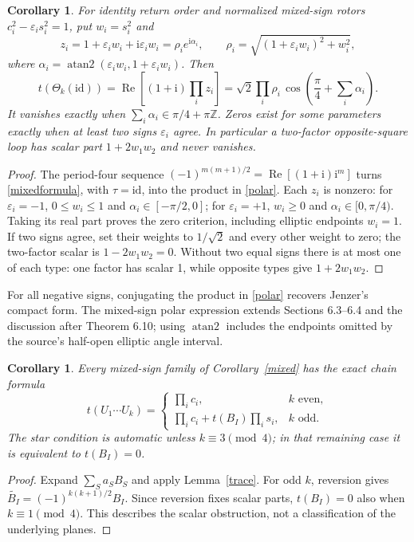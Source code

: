 \documentclass[11pt]{article}
\newtheorem{corollary}[theorem]{Corollary}
\begin{document}
\begin{corollary}\label{mixedpolar}
For identity return order and normalized mixed-sign rotors
$c_i^2-\varepsilon_i s_i^2=1$, put $w_i=s_i^2$ and
\[
z_i=1+\varepsilon_iw_i+\mathrm i\varepsilon_iw_i
       =\rho_i e^{\mathrm i\alpha_i},\qquad
\rho_i=\sqrt{(1+\varepsilon_iw_i)^2+w_i^2},
\]
where $\alpha_i=\operatorname{atan2}(\varepsilon_iw_i,1+\varepsilon_iw_i)$.
Then
\begin{equation}\label{polar}
t(\Theta_k(\mathrm{id}))
=\operatorname{Re}\!\left[(1+\mathrm i)\prod_i z_i\right]
=\sqrt2\prod_i\rho_i\,
  \cos\!\left(\frac\pi4+\sum_i\alpha_i\right).
\end{equation}
It vanishes exactly when $\sum_i\alpha_i\in\pi/4+\pi\mathbb Z$.
Zeros exist for some parameters exactly when at least two signs
$\varepsilon_i$ agree. In particular a two-factor opposite-square loop has
scalar part $1+2w_1w_2$ and never vanishes.
\end{corollary}
\begin{proof}
The period-four sequence
$(-1)^{m(m+1)/2}=\operatorname{Re}[(1+\mathrm i)\mathrm i^m]$
turns \eqref{mixedformula}, with $\tau=\mathrm{id}$, into the product
in \eqref{polar}. Each $z_i$ is nonzero: for $\varepsilon_i=-1$,
$0\leq w_i\leq1$ and $\alpha_i\in[-\pi/2,0]$; for
$\varepsilon_i=+1$, $w_i\geq0$ and $\alpha_i\in[0,\pi/4)$.
Taking its real part proves the zero criterion, including elliptic
endpoints $w_i=1$. If two signs agree, set their weights to $1/\sqrt2$
and every other weight to zero; the two-factor scalar is
$1-2w_1w_2=0$. Without two equal signs there is at most one of each
type: one factor has scalar 1, while opposite types give $1+2w_1w_2$.
\end{proof}
For all negative signs, conjugating the product in \eqref{polar} recovers
Jenzer's compact form. The mixed-sign polar expression extends Sections
6.3--6.4 and the discussion after Theorem 6.10; using
$\operatorname{atan2}$ includes the endpoints omitted by the source's
half-open elliptic angle interval.

\begin{corollary}\label{chaincor}
Every mixed-sign family of Corollary~\ref{mixed} has the exact chain formula
\begin{equation}\label{chain}
t(U_1\cdots U_k)=
\begin{cases}
\prod_i c_i,&k\text{ even},\\
\prod_i c_i+t(B_I)\prod_i s_i,&k\text{ odd}.
\end{cases}
\end{equation}
The star condition is automatic unless $k\equiv3\pmod4$;
in that remaining case it is equivalent to $t(B_I)=0$.
\end{corollary}
\begin{proof}
Expand $\sum_S a_SB_S$ and apply Lemma~\ref{trace}. For odd $k$,
reversion gives $\widetilde{B_I}=(-1)^{k(k+1)/2}B_I$.
Since reversion fixes scalar parts, $t(B_I)=0$ also when
$k\equiv1\pmod4$. This describes the scalar obstruction, not a
classification of the underlying planes.
\end{proof}
\end{document}
